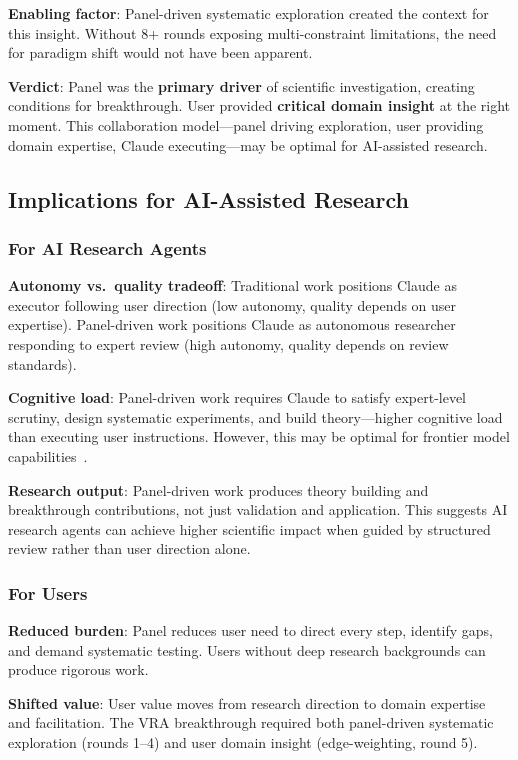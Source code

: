 \textbf{Enabling factor}: Panel-driven systematic exploration created the context for this insight. Without 8+ rounds exposing multi-constraint limitations, the need for paradigm shift would not have been apparent.

\textbf{Verdict}: Panel was the \textbf{primary driver} of scientific investigation, creating conditions for breakthrough. User provided \textbf{critical domain insight} at the right moment. This collaboration model---panel driving exploration, user providing domain expertise, Claude executing---may be optimal for AI-assisted research.

\subsection{Implications for AI-Assisted Research}

\subsubsection{For AI Research Agents}

\textbf{Autonomy vs.\ quality tradeoff}: Traditional work positions Claude as executor following user direction (low autonomy, quality depends on user expertise). Panel-driven work positions Claude as autonomous researcher responding to expert review (high autonomy, quality depends on review standards).

\textbf{Cognitive load}: Panel-driven work requires Claude to satisfy expert-level scrutiny, design systematic experiments, and build theory---higher cognitive load than executing user instructions. However, this may be optimal for frontier model capabilities~\cite{anthropic2025sonnet45}.

\textbf{Research output}: Panel-driven work produces theory building and breakthrough contributions, not just validation and application. This suggests AI research agents can achieve higher scientific impact when guided by structured review rather than user direction alone.

\subsubsection{For Users}

\textbf{Reduced burden}: Panel reduces user need to direct every step, identify gaps, and demand systematic testing. Users without deep research backgrounds can produce rigorous work.

\textbf{Shifted value}: User value moves from research direction to domain expertise and facilitation. The VRA breakthrough required both panel-driven systematic exploration (rounds 1--4) and user domain insight (edge-weighting, round 5).

